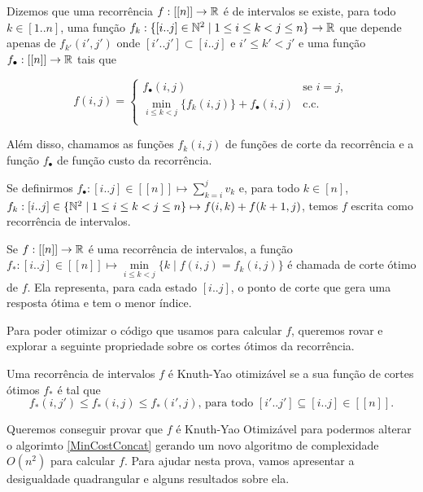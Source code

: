\begin{defi} \label{rec_int}
Dizemos que uma recorrência $f : [[n]] \to \mathbb{R}$ é de intervalos se existe, para todo $k \in [1..n]$, uma função $f_k : \{[i..j] \in \mathbb{N}^2 \mid 1 \leq i \leq k < j \leq n \} \to \mathbb{R}$ que depende apenas de $f_{k'}(i',j')$ onde $[i'..j'] \subset [i..j]$ e $i' \leq k' < j'$ e uma função $f_\bullet : [[n]] \to \mathbb{R}$ tais que

$$
f(i,j) = \begin{cases}
    f_\bullet (i,j) & \text{se } i = j, \\
    \min\limits_{i \leq k < j} \Big\{ f_k(i,j) \Big\} + f_\bullet (i,j) & \text{c.c.} \\
\end{cases}
$$

Além disso, chamamos as funções $f_k(i,j)$ de funções de corte da recorrência e a função $f_\bullet$ de função custo da recorrência.
\end{defi}

Se definirmos $f_\bullet : [i..j] \in [[n]] \mapsto \sum\limits_{k=i}^j v_k$ e, para todo $k \in [n]$, $f_k : [i..j] \in \{ \mathbb{N}^2 \mid 1 \leq i \leq k < j \leq n \} \mapsto f(i,k) + f(k+1,j)$, temos $f$ escrita como recorrência de intervalos.

\begin{defi}
Se $f : [[n]] \to \mathbb{R}$ é uma recorrência de intervalos, a função $f_* : [i..j] \in [[n]] \mapsto \min\limits_{i \leq k < j} \Big\{ k \mid f(i,j) = f_k(i,j) \Big\}$ é chamada de corte ótimo de $f$. Ela representa, para cada estado $[i..j]$, o ponto de corte que gera uma resposta ótima e tem o menor índice. 
\end{defi}

Para poder otimizar o código que usamos para calcular $f$, queremos rovar e explorar a seguinte propriedade sobre os cortes ótimos da recorrência.

\begin{defi} \label{knuthyao}
Uma recorrência de intervalos $f$ é Knuth-Yao otimizável se a sua função de cortes ótimos $f_*$ é tal que
$$f_*(i,j') \leq f_*(i,j) \leq f_*(i',j) \text{, para todo } [i'..j'] \subseteq [i..j] \in [[n]] \text{.}$$
\end{defi}

Queremos conseguir provar que $f$ é Knuth-Yao Otimizável para podermos alterar o algorimto \ref{MinCostConcat} gerando um novo algoritmo de complexidade $O(n^2)$ para calcular $f$. Para ajudar nesta prova, vamos apresentar a desigualdade quadrangular e alguns resultados sobre ela. \\

